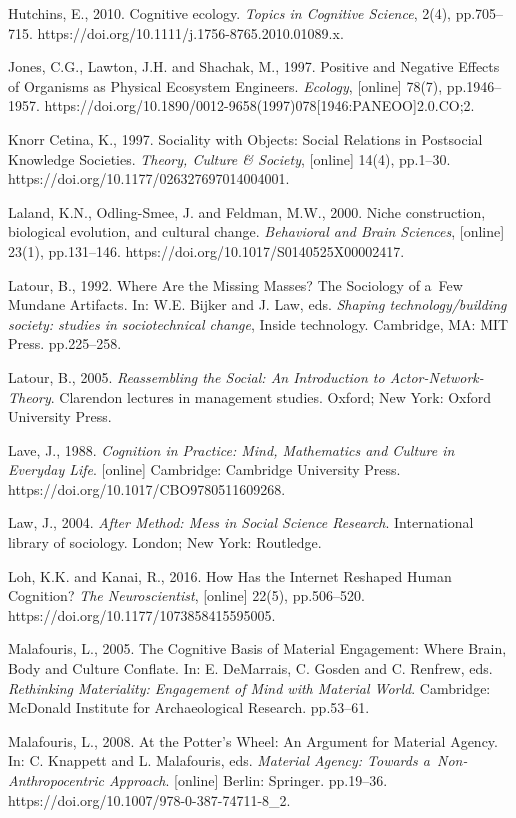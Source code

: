 Hutchins, E., 2010. Cognitive ecology. \textit{Topics in Cognitive Science}, 2(4), pp.705–715. https://doi.org/10.1111/j.1756-8765.2010.01089.x.

Jones, C.G., Lawton, J.H. and Shachak, M., 1997. Positive and Negative Effects of Organisms as Physical Ecosystem Engineers. \textit{Ecology}, [online] 78(7), pp.1946–1957. https://doi.org/10.1890/0012-9658(1997)078[1946:PANEOO]2.0.CO;2.

Knorr Cetina, K., 1997. Sociality with Objects: Social Relations in Postsocial Knowledge Societies. \textit{Theory, Culture \& Society}, [online] 14(4), pp.1–30. https://doi.org/10.1177/026327697014004001.

Laland, K.N., Odling-Smee, J. and Feldman, M.W., 2000. Niche construction, biological evolution, and cultural change. \textit{Behavioral and Brain Sciences}, [online] 23(1), pp.131–146. https://doi.org/10.1017/S0140525X00002417.

Latour, B., 1992. Where Are the Missing Masses? The Sociology of a~Few Mundane Artifacts. In: W.E. Bijker and J. Law, eds. \textit{Shaping technology/building society: studies in sociotechnical change}, Inside technology. Cambridge, MA: MIT Press. pp.225–258.

Latour, B., 2005. \textit{Reassembling the Social: An Introduction to Actor-Network-Theory}. Clarendon lectures in management studies. Oxford; New York: Oxford University Press.

Lave, J., 1988. \textit{Cognition in Practice: Mind, Mathematics and Culture in Everyday Life}. [online] Cambridge: Cambridge University Press. https://doi.org/10.1017/CBO9780511609268.

Law, J., 2004. \textit{After Method: Mess in Social Science Research}. International library of sociology. London; New York: Routledge.

Loh, K.K. and Kanai, R., 2016. How Has the Internet Reshaped Human Cognition? \textit{The Neuroscientist}, [online] 22(5), pp.506–520. https://doi.org/10.1177/1073858415595005.

Malafouris, L., 2005. The Cognitive Basis of Material Engagement: Where Brain, Body and Culture Conflate. In: E. DeMarrais, C. Gosden and C. Renfrew, eds. \textit{Rethinking Materiality: Engagement of Mind with Material World}. Cambridge: McDonald Institute for Archaeological Research. pp.53–61.

Malafouris, L., 2008. At the Potter's Wheel: An Argument for Material Agency. In: C. Knappett and L. Malafouris, eds. \textit{Material Agency: Towards a~Non-Anthropocentric Approach}. [online] Berlin: Springer. pp.19–36. https://doi.org/10.1007/978-0-387-74711-8\_2.

